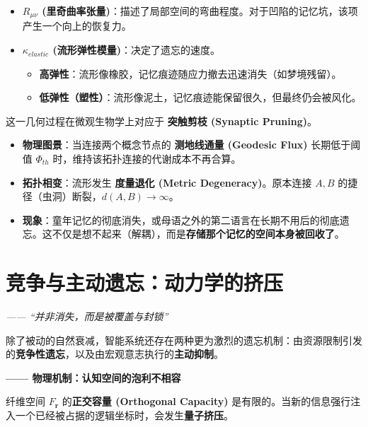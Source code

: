 \begin{itemize}
    \item   \textbf{$R_{\mu\nu}$ (里奇曲率张量)}：描述了局部空间的弯曲程度。对于凹陷的记忆坑，该项产生一个向上的恢复力。
    \item   \textbf{$\kappa_{elastic}$ (流形弹性模量)}：决定了遗忘的速度。
    \begin{itemize}
        \item   \textbf{高弹性}：流形像橡胶，记忆痕迹随应力撤去迅速消失（如梦境残留）。
        \item   \textbf{低弹性（塑性）}：流形像泥土，记忆痕迹能保留很久，但最终仍会被风化。
    \end{itemize}
\end{itemize}


这一几何过程在微观生物学上对应于 \textbf{突触剪枝 (Synaptic Pruning)}。

\begin{itemize}
    \item   \textbf{物理图景}：当连接两个概念节点的 \textbf{测地线通量 (Geodesic Flux)} 长期低于阈值 $\Phi_{th}$ 时，维持该拓扑连接的代谢成本不再合算。
    \item   \textbf{拓扑相变}：流形发生 \textbf{度量退化 (Metric Degeneracy)}。原本连接 $A, B$ 的捷径（虫洞）断裂，$d(A, B) \to \infty$。
    \item   \textbf{现象}：童年记忆的彻底消失，或母语之外的第二语言在长期不用后的彻底遗忘。这不仅是想不起来（解耦），而是\textbf{存储那个记忆的空间本身被回收了}。
\end{itemize}

\section{竞争与主动遗忘：动力学的挤压}
\label{sec:competitive_active_forgetting}

\textit{—— “并非消失，而是被覆盖与封锁”}

除了被动的自然衰减，智能系统还存在两种更为激烈的遗忘机制：由资源限制引发的\textbf{竞争性遗忘}，以及由宏观意志执行的\textbf{主动抑制}。


\textbf{—— 物理机制：认知空间的泡利不相容}

纤维空间 $F_\mathbf{r}$ 的\textbf{正交容量 (Orthogonal Capacity)} 是有限的。当新的信息强行注入一个已经被占据的逻辑坐标时，会发生\textbf{量子挤压}。

